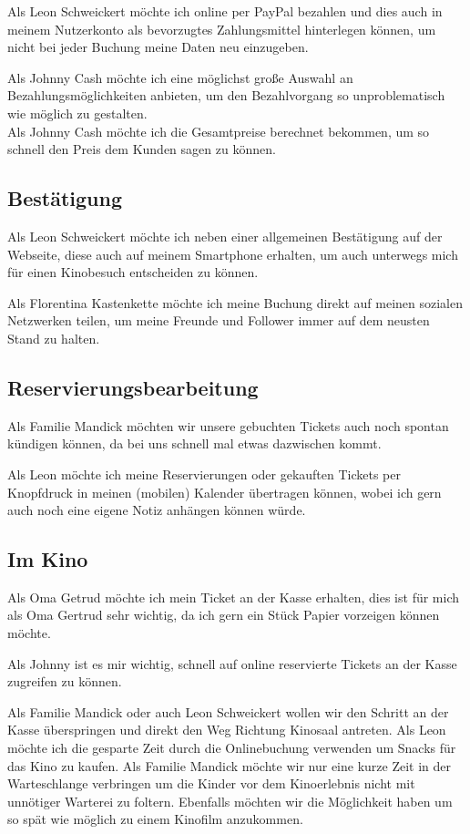 Als Leon Schweickert möchte ich online per PayPal bezahlen und dies auch in meinem Nutzerkonto als bevorzugtes Zahlungsmittel hinterlegen können, um nicht bei jeder Buchung meine Daten neu einzugeben.

Als Johnny Cash möchte ich eine möglichst große Auswahl an Bezahlungsmöglichkeiten anbieten, um den Bezahlvorgang so unproblematisch wie möglich zu gestalten.
\\
Als Johnny Cash möchte ich die Gesamtpreise berechnet bekommen, um so schnell den Preis dem Kunden sagen zu können.

\subsection{Bestätigung}
Als Leon Schweickert möchte ich neben einer allgemeinen Bestätigung auf der Webseite, diese auch auf meinem Smartphone erhalten, um auch unterwegs mich für einen Kinobesuch entscheiden zu können.

Als Florentina Kastenkette möchte ich meine Buchung direkt auf meinen sozialen Netzwerken teilen, um meine Freunde und Follower immer auf dem neusten Stand zu halten.

\subsection{Reservierungsbearbeitung}
Als Familie Mandick möchten wir unsere gebuchten Tickets auch noch spontan kündigen können, da bei uns schnell mal etwas dazwischen kommt. 

Als Leon möchte ich meine Reservierungen oder gekauften Tickets per Knopfdruck in meinen (mobilen) Kalender übertragen können, wobei ich gern auch noch eine eigene Notiz anhängen können würde.

\subsection{Im Kino}
Als Oma Getrud möchte ich mein Ticket an der Kasse erhalten, dies ist für mich als Oma Gertrud sehr wichtig, da ich gern ein Stück Papier vorzeigen können möchte.

Als Johnny ist es mir wichtig, schnell auf online reservierte Tickets an der Kasse zugreifen zu können.

Als Familie Mandick oder auch Leon Schweickert wollen wir den Schritt an der Kasse überspringen und direkt den Weg Richtung Kinosaal antreten.
Als Leon möchte ich die gesparte Zeit durch die Onlinebuchung verwenden um Snacks für das Kino zu kaufen.
Als Familie Mandick möchte wir nur eine kurze Zeit in der Warteschlange verbringen um die Kinder vor dem Kinoerlebnis nicht mit unnötiger Warterei zu foltern.
Ebenfalls möchten wir die Möglichkeit haben um so spät wie möglich zu einem Kinofilm anzukommen.

